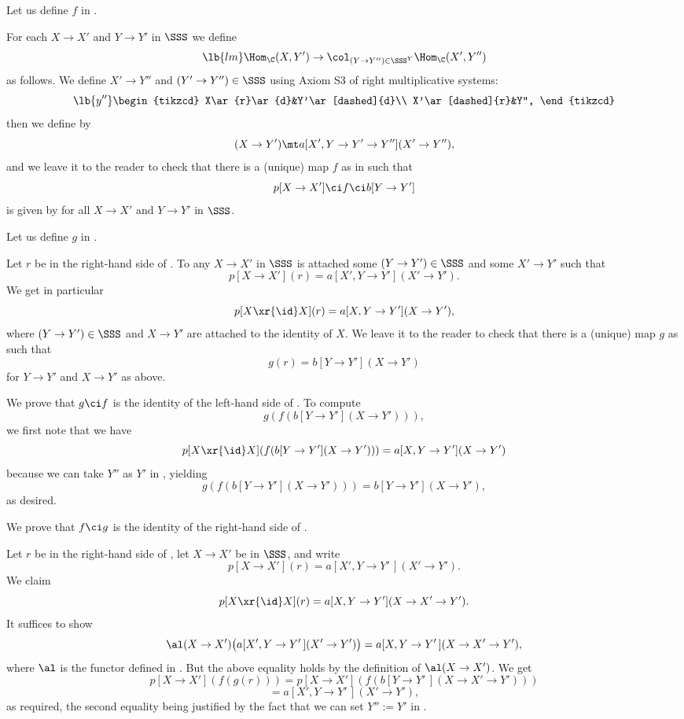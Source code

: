 \documentclass[12pt]{article}
\theoremstyle{remark}
\theoremstyle{definition}
\begin{document}
Let us define $f$ in . 

For each $X\to X'$ and $Y\to Y'$ in $\SSS$ we define 
\begin{equation}\lb{lm}
\Hom_\C(X,Y')\to\col_{(Y\to Y'')\in\SSS^Y}\Hom_\C(X',Y'')
\end{equation} 
as follows. We define $X'\to Y''$ and $(Y'\to Y'')\in\SSS$ using Axiom S3 of right multiplicative systems:
\begin{equation}\lb{y''}
\begin{tikzcd}
X\ar{r}\ar{d}&Y'\ar[dashed]{d}\\ X'\ar[dashed]{r}&Y'',
\end{tikzcd}
\end{equation} 
then we define  by 
$$
(X\to Y')\mt a[X',Y\to Y'\to Y''](X'\to Y''),
$$ 
and we leave it to the reader to check that there is a (unique) map $f$ as in  such that 
$$
p[X\to X']\ci f\ci b[Y\to Y']
$$ 
is given by  for all $X\to X'$ and $Y\to Y'$ in $\SSS$. 

Let us define $g$ in . 

Let $r$ be in the right-hand side of . To any $X\to X'$ in $\SSS$ is attached some $(Y\to Y')\in\SSS$ and some $X'\to Y'$ such that 
$$
p[X\to X'](r)=a[X',Y\to Y'](X'\to Y').
$$ 
We get in particular 
$$
p[X\xr{\id}X](r)=a[X,Y\to Y'](X\to Y'),
$$ 
where $(Y\to Y')\in\SSS$ and $X\to Y'$ are attached to the identity of $X$. We leave it to the reader to check that there is a (unique) map $g$ as  such that 
$$
g(r)=b[Y\to Y'](X\to Y')
$$ 
for $Y\to Y'$ and $X\to Y'$ as above. 

We prove that $g\ci f$ is the identity of the left-hand side of . To compute 
$$
g(f(b[Y\to Y'](X\to Y'))),
$$ 
we first note that we have 
$$
p[X\xr{\id}X](f(b[Y\to Y'](X\to Y')))=a[X,Y\to Y'](X\to Y')
$$ 
because we can take $Y''$ as $Y'$ in , yielding 
$$
g(f(b[Y\to Y'](X\to Y')))=b[Y\to Y'](X\to Y'),
$$ 
as desired.

%

We prove that $f\ci g$ is the identity of the right-hand side of .

Let $r$ be in the right-hand side of , let $X\to X'$ be in $\SSS$, and write 
$$
p[X\to X'](r)=a[X',Y\to Y'\,](X'\to Y').
$$ 
We claim 
$$
p[X\xr{\id}X](r)=a[X,Y\to Y'](X\to X'\to Y').
$$  
It suffices to show 
$$
\al(X\to X')\big(a[X',Y\to Y'\,](X'\to Y')\big)=a[X,Y\to Y'\,](X\to X'\to Y'),
$$
where $\al$ is the functor defined in . But the above equality holds by the definition of $\al(X\to X')$. We get
$$
p[X\to X'](f(g(r)))=p[X\to X'](f(b[Y\to Y'\,](X\to X'\to Y')))
$$ 
$$
=a[X',Y\to Y'\,](X'\to Y'),
$$ 
as required, the second equality being justified by the fact that we can set $Y'':=Y'$ in .
\end{document}
